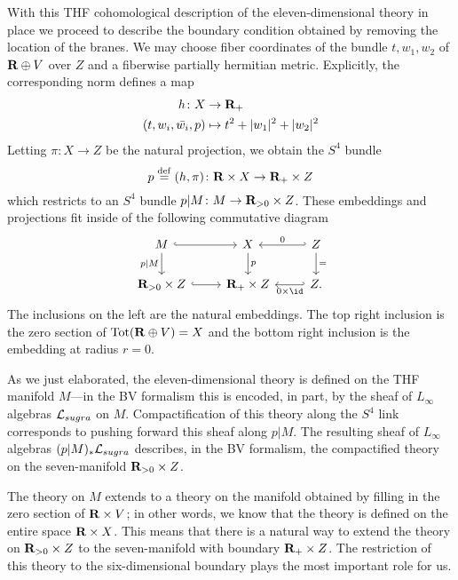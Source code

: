 With this THF cohomological description of the eleven-dimensional theory in place we proceed to describe the boundary condition obtained by removing the location of the branes.
We may choose fiber coordinates of the bundle $t, w_{1}, w_{2}$ of $\mathbf{R} \oplus V$ over $Z$ and a fiberwise partially hermitian metric.
Explicitly, the corresponding norm defines a map
\begin{align*}
 h \colon  X & \to \mathbf{R}_{+} \\
  (t, w_{i}, \bar{w_{i}}, p)& \mapsto t^{2} + |w_{1}|^{2}+|w_{2}|^{2}
\end{align*}
Letting $\pi \colon X \to Z$ be the natural projection, we obtain the $S^{4}$ bundle
\[
p \overset{\rm def}{=} (h,\pi) \colon \mathbf{R} \times X \to \mathbf{R}_{+}\times Z
\]
which restricts to an $S^4$ bundle $p|M \colon M \to \mathbf{R}_{>0} \times Z$.
These embeddings and projections fit inside of the following commutative diagram
\[
\begin{tikzcd}
M \ar[d,"p|M"'] \ar[r,hook] & X \ar[d,"p"] & \ar[l,hook',"0"'] Z \ar[d,"="] \\
\R_{>0} \times Z \ar[r,hook] & \R_{+} \times Z & \ar[l,hook',"0 \times \id"] Z.
\end{tikzcd}
\]
The inclusions on the left are the natural embeddings.
The top right inclusion is the zero section of ${\rm Tot}(\mathbf{R} \oplus V) = X$ and the bottom right inclusion is the embedding at radius $r = 0$.

As we just elaborated, the eleven-dimensional theory is defined on the THF manifold $M$---in the BV formalism this is encoded, in part, by the sheaf of $L_\infty$ algebras $\mathcal L_{sugra}$ on $M$.
Compactification of this theory along the $S^4$ link corresponds to pushing forward this sheaf along $p|M$.
The resulting sheaf of $L_\infty$ algebras $(p|M)_*\mathcal L_{sugra}$ describes, in the BV formalism, the compactified theory on the seven-manifold $\mathbf{R}_{>0} \times Z$.

The theory on $M$ extends to a theory on the manifold obtained by filling in the zero section of $\mathbf{R} \times V$; in other words, we know that the theory is defined on the entire space $\mathbf{R} \times X$.
This means that there is a natural way to extend the theory on $\mathbf{R}_{>0} \times Z$ to the seven-manifold with boundary $\mathbf{R}_{+} \times Z$.
The restriction of this theory to the six-dimensional boundary plays the most important role for us.

